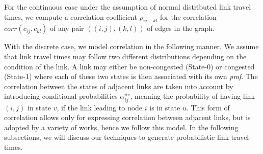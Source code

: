For the continuous case under the assumption of normal distributed link travel
times, we compute a correlation coefficient $\rho_{ij-kl}$ for the correlation
$corr(c_{ij},c_{kl})$ of any pair $((i,j), (k,l))$ of edges in the graph.

With the discrete case, we model correlation in the following manner. We assume
that link travel times may follow two different distributions depending on the condition of the link. A link may
either be non-congested (State-0) or congested (State-1) where each of these
two states is then associated with its own \textit{pmf}. The correlation between the states
of adjacent links are taken into account by introducing conditional
probabilities $\alpha^{uv}_{ij}$, meaning the probability of having link $(i,j)$
in state $v$, if the link leading to node $i$ is  in state $u$. This form of
correlation allows only for expressing correlation between adjacent links, but
is adopted by a variety of works, hence we follow this model. In the following
subsections, we will discuss our techniques to generate probabilistic link travel-times.  




